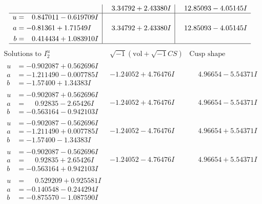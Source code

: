 \documentclass[1p]{elsarticle_modified}
\theoremstyle{definition}
\newcommand{\I}{\sqrt{-1}}
\begin{document}
$$\begin{array}{c|c|c}
 & \phantom{-}3.34792 + 2.43380 I & \phantom{-}12.85093 - 4.05145 I \\ \hline\begin{aligned}
u &= \phantom{-}0.847011 - 0.619709 I \\
a &= -0.81361 + 1.71549 I \\
b &= \phantom{-}0.414434 + 1.083910 I\end{aligned}
 & \phantom{-}3.34792 + 2.43380 I & \phantom{-}12.85093 - 4.05145 I\\
 \hline 
 \end{array}$$\newpage$$\begin{array}{c|c|c}  
\text{Solutions to }I^u_{2}& \I (\text{vol} + \sqrt{-1}CS) & \text{Cusp shape}\\
 \hline 
\begin{aligned}
u &= -0.902087 + 0.562696 I \\
a &= -1.211490 - 0.007785 I \\
b &= -1.57400 + 1.34383 I\end{aligned}
 & -1.24052 + 4.76476 I & \phantom{-}4.96654 - 5.54371 I \\ \hline\begin{aligned}
u &= -0.902087 + 0.562696 I \\
a &= \phantom{-}0.92835 - 2.65426 I \\
b &= -0.563164 - 0.942103 I\end{aligned}
 & -1.24052 + 4.76476 I & \phantom{-}4.96654 - 5.54371 I \\ \hline\begin{aligned}
u &= -0.902087 - 0.562696 I \\
a &= -1.211490 + 0.007785 I \\
b &= -1.57400 - 1.34383 I\end{aligned}
 & -1.24052 - 4.76476 I & \phantom{-}4.96654 + 5.54371 I \\ \hline\begin{aligned}
u &= -0.902087 - 0.562696 I \\
a &= \phantom{-}0.92835 + 2.65426 I \\
b &= -0.563164 + 0.942103 I\end{aligned}
 & -1.24052 - 4.76476 I & \phantom{-}4.96654 + 5.54371 I \\ \hline\begin{aligned}
u &= \phantom{-}0.529209 + 0.925581 I \\
a &= -0.140548 - 0.244294 I \\
b &= -0.875570 - 1.087590 I\end{aligned}

\end{array}$$
\end{document}
